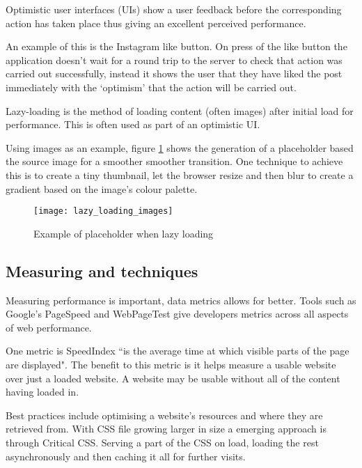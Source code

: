 Optimistic user interfaces (UIs) show a user feedback before the corresponding action has taken place thus giving an excellent perceived performance.

An example of this is the Instagram like button. On press of the like button the application doesn't wait for a round trip to the server to check that action was carried out successfully, instead it shows the user that they have liked the post immediately with the `optimism' that the action will be carried out. \cite{performing_actions_optimisitically}

Lazy-loading is the method of loading content (often images) after initial load for performance. This is often used as part of an optimistic UI.

Using images as an example, figure \ref{figure-lazy-loading-images} shows the generation of a placeholder based the source image for a smoother smoother transition. One technique to achieve this is to create a tiny thumbnail, let the browser resize and then blur to create a gradient based on the image's colour palette. \cite{image_colours_lazy_loading}

\begin{figure}[H]
  \centering
    \texttt{[image: lazy\_loading\_images]}
  \caption{Example of placeholder when lazy loading \protect\cite{image_colours_lazy_loading}}
  \label{figure-lazy-loading-images}
\end{figure}

\subsection{Measuring and techniques} \label{l-r--measuring-and-techniques}

Measuring performance is important, data metrics allows for better. Tools such as Google's PageSpeed and WebPageTest give developers metrics across all aspects of web performance.

One metric is SpeedIndex ``is the average time at which visible parts of the page are displayed". The benefit to this metric is it helps measure a usable website over just a loaded website. A website may be usable without all of the content having loaded in. \cite{speed_index}

Best practices include optimising a website's resources and where they are retrieved from. With CSS file growing larger in size a emerging approach is through Critical CSS. Serving a part of the CSS on load, loading the rest asynchronously and then caching it all for further visits. \cite{fast_as_heck}

